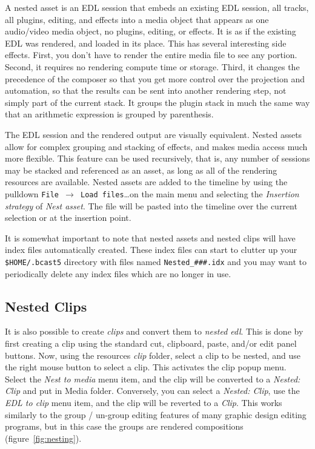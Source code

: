 A nested asset is an EDL session that
embeds an existing EDL session, all tracks, all plugins, editing,
and effects into a media object that appears as one audio/video
media object, no plugins, editing, or effects.  It is as if the
existing EDL was rendered, and loaded in its place.  This has
several interesting side effects.  First, you don’t have to render
the entire media file to see any portion.  Second, it requires no
rendering compute time or storage.  Third, it changes the precedence
of the composer so that you get more control over the projection and
automation, so that the results can be sent into another rendering
step, not simply part of the current stack.  It groups the plugin
stack in much the same way that an arithmetic expression is grouped
by parenthesis.

The EDL session and the rendered output are visually equivalent.
Nested assets allow for complex grouping and stacking of effects,
and makes media access much more flexible.  This feature can be used
recursively, that is, any number of sessions may be stacked and
referenced as an asset, as long as all of the rendering resources
are available.  Nested assets are added to the timeline by using the
pulldown \texttt{File $\rightarrow$ Load files}\dots on the main
menu and selecting the \textit{Insertion strategy} of \textit{Nest
	asset}. The file will be pasted into the timeline over the current
selection or at the insertion point.

It is somewhat important to note that nested assets and nested clips
will have index files automatically created.  These index files can
start to clutter up your \texttt{\$HOME/.bcast5} directory with
files named \texttt{Nested\_\#\#\#.idx} and you may want to
periodically delete any index files which are no longer in use.

\subsection{Nested Clips}%
\label{sub:nested_clips}

 It is also possible to create
\textit{clips} and convert them to \textit{nested edl}.  This is
done by first creating a clip using the standard cut, clipboard,
paste, and/or edit panel buttons.  Now, using the resources
\textit{clip} folder, select a clip to be nested, and use the right
mouse button to select a clip.  This activates the clip popup menu.
Select the \textit{Nest to media} menu item, and the clip will be
converted to a \textit{Nested: Clip} and put in Media
folder. Conversely, you can select a \textit{Nested: Clip}, use the
\textit{EDL to clip} menu item, and the clip will be reverted to a
\textit{Clip}.  This works similarly to the group / un-group editing
features of many graphic design editing programs, but in this case
the groups are rendered compositions (figure~\ref{fig:nesting}).

